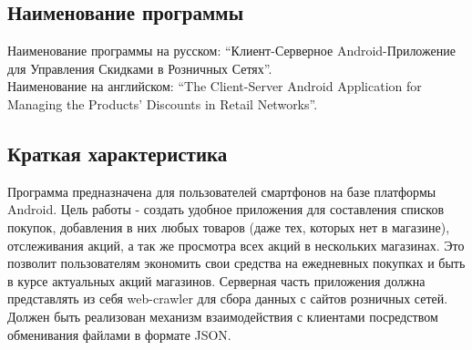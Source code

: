 \subsection{Наименование программы}
Наименование программы на русском:
``Клиент-Серверное Android-Приложение для Управления Скидками в Розничных Сетях''. \\
Наименование на английском:
``The Client-Server Android Application for Managing the Products' Discounts in Retail Networks''. \\


\subsection{Краткая характеристика}
Программа предназначена для пользователей смартфонов на базе платформы Android.
Цель работы - создать удобное приложения для составления списков покупок,
добавления в них любых товаров (даже тех, которых нет в магазине), отслеживания
акций, а так же просмотра всех акций в нескольких магазинах. Это позволит
пользователям экономить свои средства на ежедневных покупках и быть в курсе
актуальных акций магазинов.  Серверная часть приложения должна представлять из
себя web-crawler для сбора данных с сайтов розничных сетей. Должен быть
реализован механизм взаимодействия с клиентами посредством обменивания файлами
в формате JSON.

